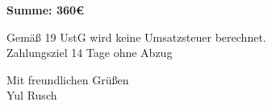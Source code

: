 \documentclass[12pt]{article}
\begin{document}
\vspace{2cm}

\begin{flushleft}

\textbf{Summe: \mbox{\hspace{12.7cm}} 360€}

\vspace{0.2cm}

Gemäß 19 UstG wird keine Umsatzsteuer berechnet.\\
Zahlungsziel 14 Tage ohne Abzug\\

\vspace{0.5cm}

Mit freundlichen Grüßen\\
Yul Rusch

\end{flushleft}
\end{document}
